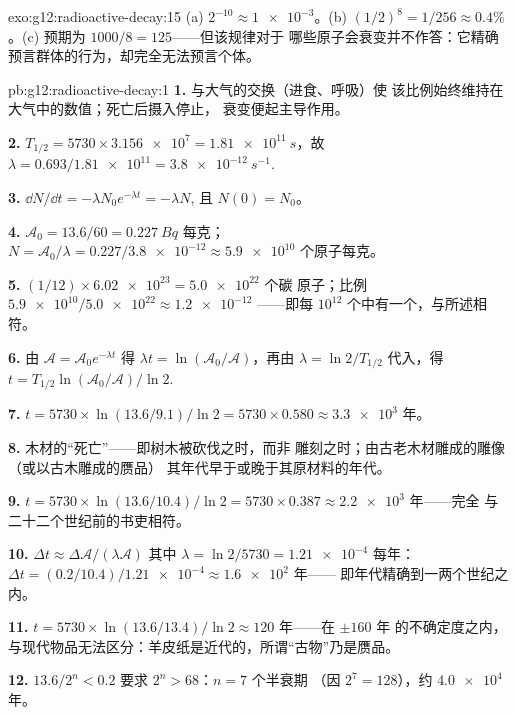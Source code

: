 \begin{solution}{exo:g12:radioactive-decay:15}
(a) $2^{-10} \approx \num{1e-3}$。(b) $(1/2)^8 = 1/256 \approx
0.4\%$。(c) 预期为 $1000/8 = 125$——但该规律对于
哪些原子会衰变并不作答：它精确预言群体的行为，却完全无法预言个体。
\end{solution}

\begin{solution}{pb:g12:radioactive-decay:1}
\textbf{1.} 与大气的交换（进食、呼吸）使
该比例始终维持在大气中的数值；死亡后摄入停止，
衰变便起主导作用。

\textbf{2.} $T_{1/2} = \num{5730} \times \num{3.156e7} =
\qty{1.81e11}{s}$，故 $\lambda = 0.693/\num{1.81e11} =
\qty{3.8e-12}{s^{-1}}$.

\textbf{3.} $\dd N/\dd t = -\lambda N_0 e^{-\lambda t} = -\lambda N$,
且 $N(0) = N_0$。

\textbf{4.} $\mathcal A_0 = 13.6/60 = \qty{0.227}{Bq}$ 每克；
$N = \mathcal A_0/\lambda = 0.227/\num{3.8e-12} \approx \num{5.9e10}$
个原子每克。

\textbf{5.} $(1/12) \times \num{6.02e23} = \num{5.0e22}$ 个碳
原子；比例 $\num{5.9e10}/\num{5.0e22} \approx \num{1.2e-12}$
——即每 $10^{12}$ 个中有一个，与所述相符。

\textbf{6.} 由 $\mathcal A = \mathcal A_0 e^{-\lambda t}$ 得
$\lambda t = \ln(\mathcal A_0/\mathcal A)$，再由 $\lambda =
\ln 2/T_{1/2}$ 代入，得
$t = T_{1/2}\ln(\mathcal A_0/\mathcal A)/\ln 2$.

\textbf{7.} $t = \num{5730} \times \ln(13.6/9.1)/\ln 2 =
\num{5730} \times 0.580 \approx \num{3.3e3}$ 年。

\textbf{8.} 木材的“死亡”——即树木被砍伐之时，而非
雕刻之时；由古老木材雕成的雕像（或以古木雕成的赝品）
其年代早于或晚于其原材料的年代。

\textbf{9.} $t = \num{5730} \times \ln(13.6/10.4)/\ln 2 =
\num{5730} \times 0.387 \approx \num{2.2e3}$ 年——完全
与二十二个世纪前的书吏相符。

\textbf{10.} $\Delta t \approx \Delta\mathcal A/(\lambda\mathcal A)$
其中 $\lambda = \ln 2/5730 = \num{1.21e-4}$ 每年：
$\Delta t = (0.2/10.4)/\num{1.21e-4} \approx \num{1.6e2}$ 年——
即年代精确到一两个世纪之内。

\textbf{11.} $t = \num{5730} \times \ln(13.6/13.4)/\ln 2 \approx
120$ 年——在 $\pm 160$ 年
的不确定度之内，与现代物品无法区分：羊皮纸是近代的，所谓“古物”乃是赝品。

\textbf{12.} $13.6/2^n < 0.2$ 要求 $2^n > 68$：$n = 7$ 个半衰期
（因 $2^7 = 128$），约 $\num{4.0e4}$ 年。


\end{solution}
